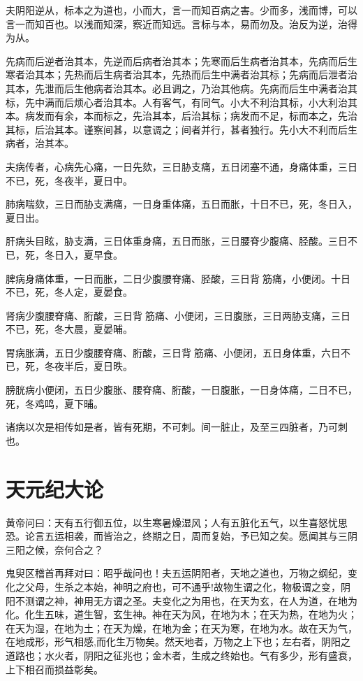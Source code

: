 \documentclass{article}%
\begin{document}
夫阴阳逆从，标本之为道也，小而大，言一而知百病之害。少而多，浅而博，可以言一而知百也。以浅而知深，察近而知远。言标与本，易而勿及。治反为逆，治得为从。

先病而后逆者治其本，先逆而后病者治其本；先寒而后生病者治其本，先病而后生寒者治其本；先热而后生病者治其本，先热而后生中满者治其标；先病而后泄者治其本，先泄而后生他病者治其本。必且调之，乃治其他病。先病而后生中满者治其标，先中满而后烦心者治其本。人有客气，有同气。小大不利治其标，小大利治其本。病发而有余，本而标之，先治其本，后治其标；病发而不足，标而本之，先治其标，后治其本。谨察间甚，以意调之；间者并行，甚者独行。先小大不利而后生病者，治其本。

夫病传者，心病先心痛，一日先欬，三日胁支痛，五日闭塞不通，身痛体重，三日不已，死，冬夜半，夏日中。

肺病喘欬，三日而胁支满痛，一日身重体痛，五日而胀，十日不已，死，冬日入，夏日出。

肝病头目眩，胁支满，三日体重身痛，五日而胀，三日腰脊少腹痛、胫酸。三日不已，死，冬日入，夏早食。

脾病身痛体重，一日而胀，二日少腹腰脊痛、胫酸，三日背𦛗筋痛，小便闭。十日不已，死，冬人定，夏晏食。

肾病少腹腰脊痛、胻酸，三日背𦛗筋痛、小便闭，三日腹胀，三日两胁支痛，三日不已，死，冬大晨，夏晏晡。

胃病胀满，五日少腹腰脊痛、胻酸，三日背𦛗筋痛、小便闭，五日身体重，六日不已，死，冬夜半后，夏日昳。

膀胱病小便闭，五日少腹胀、腰脊痛、胻酸，一日腹胀，一日身体痛，二日不已，死，冬鸡鸣，夏下晡。

诸病以次是相传如是者，皆有死期，不可刺。间一脏止，及至三四脏者，乃可刺也。
\section{天元纪大论}
黄帝问曰：天有五行御五位，以生寒暑燥湿风；人有五脏化五气，以生喜怒忧思恐。论言五运相袭，而皆治之，终期之日，周而复始，予已知之矣。愿闻其与三阴三阳之候，奈何合之？

鬼臾区稽首再拜对曰：昭乎哉问也！夫五运阴阳者，天地之道也，万物之纲纪，变化之父母，生杀之本始，神明之府也，可不通乎!故物生谓之化，物极谓之变，阴阳不测谓之神，神用无方谓之圣。夫变化之为用也，在天为玄，在人为道，在地为化。化生五味，道生智，玄生神。神在天为风，在地为木；在天为热，在地为火；在天为湿，在地为土；在天为燥，在地为金；在天为寒，在地为水。故在天为气，在地成形，形气相感,而化生万物矣。然天地者，万物之上下也；左右者，阴阳之道路也；水火者，阴阳之征兆也；金木者，生成之终始也。气有多少，形有盛衰，上下相召而损益彰矣。
\end{document}
